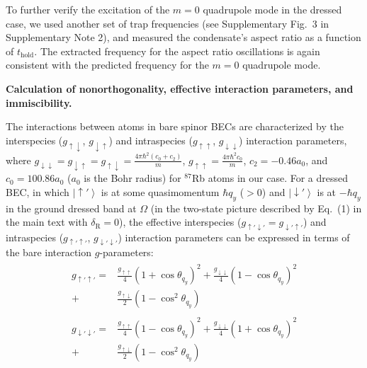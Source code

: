 \documentclass[showpacs,preprintnumbers,amsmath,amssymb, superscriptaddress, aps, reprint]{revtex4-1}
\def\deltaR{\delta_{\text{R}}}
\def\thold{t_{\text{hold}}}
\begin{document}
{{{To further verify the excitation of the $m=0$ quadrupole mode in the dressed case, we used another set of trap frequencies (see Supplementary Fig.~3 in Supplementary Note 2), and measured the condensate's aspect ratio as a function of $\thold$. The extracted frequency for the aspect ratio oscillations is again consistent with the predicted frequency for the $m=0$ quadrupole mode.

\vspace{5mm}

\textbf{Calculation of nonorthogonality, effective interaction parameters, and immiscibility.}

The interactions between atoms in bare spinor BECs are characterized by the interspecies ($g_{\uparrow \downarrow}$, $g_{\downarrow \uparrow}$) and intraspecies ($g_{\uparrow \uparrow}$, $g_{\downarrow \downarrow}$) interaction parameters, where $g_{ \downarrow \downarrow }=g_{ \downarrow \uparrow }=g_{ \uparrow \downarrow }=\frac{{4\pi {\hbar ^2}\left( {{c_0} + {c_2}} \right)}}{m}$, ${g_{ \uparrow  \uparrow }}=\frac{{4\pi {\hbar ^2}{c_0}}}{m}$, $c_2 = -0.46a_0$, and $c_0 = 100.86a_0$ ($a_0$ is the Bohr radius) for $^{87}$Rb atoms in our case. 
For a dressed BEC, in which $\left|\uparrow'\right\rangle$ is at some quasimomentum $\hbar q_y$ ($>0$) and $\left|\downarrow'\right\rangle$ is at $-\hbar q_y$ in the ground dressed band at $\Omega$ (in the two-state picture described by Eq.~(1) in the main text with $\deltaR=0$), the effective interspecies ($g_{\uparrow' \downarrow'}=g_{\downarrow' \uparrow'}$) and intraspecies ($g_{\uparrow' \uparrow'}$, $g_{\downarrow' \downarrow'}$) interaction parameters can be expressed in terms of the bare interaction $g$-parameters:
\begin{align}
\begin{split}
\label{eq_eff_guu}
g_{\uparrow'\uparrow'}=&\frac{g_{\uparrow\uparrow}}{4}(1+\cos\theta_{q_y})^2+\frac{g_{\downarrow\downarrow}}{4}(1-\cos\theta_{q_y})^2\\+&\frac{g_{\uparrow\downarrow}}{2}(1-\cos^2\theta_{q_y})
\end{split}
\end{align}
\begin{align}
\begin{split}
\label{eq_eff_gdd}
g_{\downarrow'\downarrow'}=&\frac{g_{\uparrow\uparrow}}{4}(1-\cos\theta_{q_y})^2+\frac{g_{\downarrow\downarrow}}{4}(1+\cos\theta_{q_y})^2\\+&\frac{g_{\uparrow\downarrow}}{2}(1-\cos^2\theta_{q_y})
\end{split}

\end{align}}}}
\end{document}
